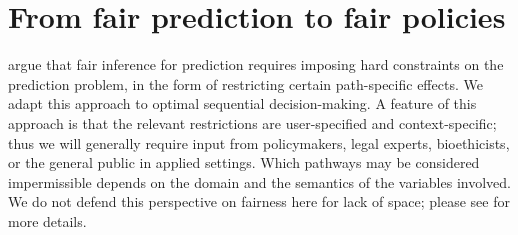 \documentclass{article}
\begin{document}
\section{From fair prediction to fair policies}
\label{sec:fairpolicy}


\citet{NabiShpitser18Fair} argue that fair inference for prediction requires imposing hard constraints on the prediction problem, in the form of restricting certain path-specific effects. We adapt this approach to optimal sequential decision-making.
A feature of this approach is that the relevant restrictions are user-specified and context-specific; thus we will generally require input from policymakers, legal experts, bioethicists, or the general public in applied settings. Which pathways may be considered impermissible depends on the domain and the semantics of the variables involved. We do not defend this perspective on fairness here for lack of space; please see \citet{NabiShpitser18Fair}
for more details.

\end{document}
